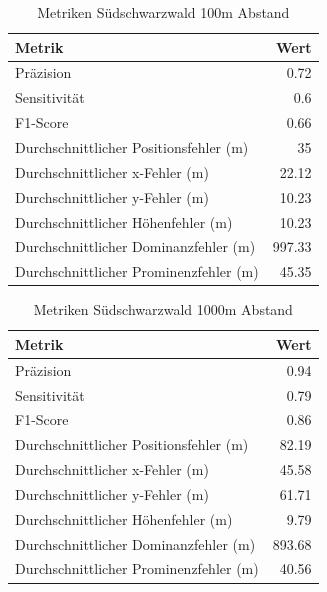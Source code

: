 \begin{table}[htbp]
\centering
\caption{Metriken Südschwarzwald 100m Abstand}
\label{tab:metrics_Blackforrest_100m}
\begin{tabular}{|l|r|}
\hline
Metrik & Wert \\
\hline
Präzision & 0.72 \\
\hline
Sensitivität & 0.6 \\
\hline
F1-Score & 0.66 \\
\hline
Durchschnittlicher Positionsfehler (m) & 35 \\
\hline
Durchschnittlicher x-Fehler (m) & 22.12 \\
\hline
Durchschnittlicher y-Fehler (m) & 10.23 \\
\hline
Durchschnittlicher Höhenfehler (m) & 10.23 \\
\hline
Durchschnittlicher Dominanzfehler (m) & 997.33 \\
\hline
Durchschnittlicher Prominenzfehler (m) & 45.35 \\
\hline
\end{tabular}
\end{table}

\begin{table}[htbp]
\centering
\caption{Metriken Südschwarzwald 1000m Abstand}
\label{tab:metrics_Blackforrest_1000m}
\begin{tabular}{|l|r|}
\hline
Metrik & Wert \\
\hline
Präzision & 0.94 \\
\hline
Sensitivität & 0.79 \\
\hline
F1-Score & 0.86 \\
\hline
Durchschnittlicher Positionsfehler (m) & 82.19 \\
\hline
Durchschnittlicher x-Fehler (m) & 45.58 \\
\hline
Durchschnittlicher y-Fehler (m) & 61.71 \\
\hline
Durchschnittlicher Höhenfehler (m) & 9.79 \\
\hline
Durchschnittlicher Dominanzfehler (m) & 893.68 \\
\hline
Durchschnittlicher Prominenzfehler (m) & 40.56 \\
\hline
\end{tabular}
\end{table}

